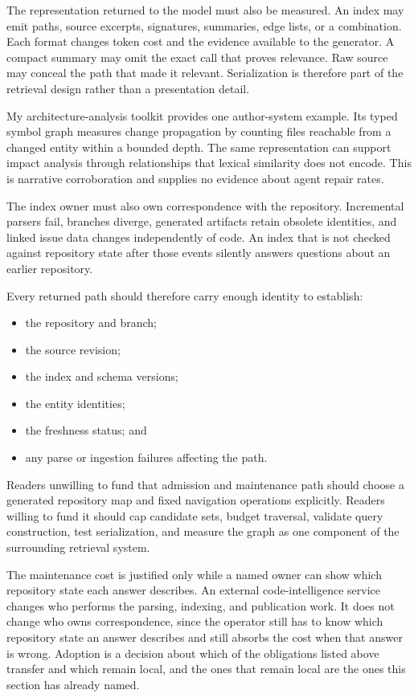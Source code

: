 The representation returned to the model must also be measured. An index may emit paths, source excerpts, signatures, summaries, edge lists, or a combination. Each format changes token cost and the evidence available to the generator. A compact summary may omit the exact call that proves relevance. Raw source may conceal the path that made it relevant. Serialization is therefore part of the retrieval design rather than a presentation detail.

My architecture-analysis toolkit provides one author-system example. Its typed symbol graph measures change propagation by counting files reachable from a changed entity within a bounded depth. The same representation can support impact analysis through relationships that lexical similarity does not encode. This is narrative corroboration and supplies no evidence about agent repair rates.

The index owner must also own correspondence with the repository. Incremental parsers fail, branches diverge, generated artifacts retain obsolete identities, and linked issue data changes independently of code. An index that is not checked against repository state after those events silently answers questions about an earlier repository.


Every returned path should therefore carry enough identity to establish:

\begin{itemize}
\tightlist
\item
  the repository and branch;
\item
  the source revision;
\item
  the index and schema versions;
\item
  the entity identities;
\item
  the freshness status; and
\item
  any parse or ingestion failures affecting the path.
\end{itemize}

Readers unwilling to fund that admission and maintenance path should choose a generated repository map and fixed navigation operations explicitly. Readers willing to fund it should cap candidate sets, budget traversal, validate query construction, test serialization, and measure the graph as one component of the surrounding retrieval system.

The maintenance cost is justified only while a named owner can show which repository state each answer describes. An external code-intelligence service changes who performs the parsing, indexing, and publication work. It does not change who owns correspondence, since the operator still has to know which repository state an answer describes and still absorbs the cost when that answer is wrong. Adoption is a decision about which of the obligations listed above transfer and which remain local, and the ones that remain local are the ones this section has already named.

